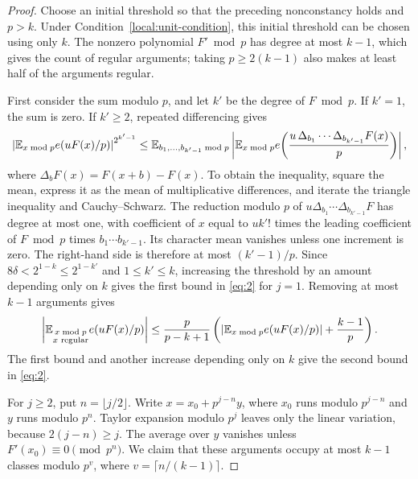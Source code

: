 \begin{proof}
Choose an initial threshold so that the preceding nonconstancy holds and
\(p>k\). Under Condition~\eqref{local:unit-condition}, this initial threshold
can be chosen using only \(k\). The nonzero polynomial \(F'\bmod p\) has
degree at most \(k-1\), which gives the count of regular arguments; taking
\(p\ge2(k-1)\) also makes at least half of the arguments regular.

First consider the sum modulo \(p\), and let \(k'\) be the degree of
\(F\bmod p\). If \(k'=1\), the sum is zero. If \(k'\ge2\), repeated
differencing gives
\[
 \left|\mathbb E_{x\bmod p}e(uF(x)/p)\right|^{2^{k'-1}}
 \le
 \mathbb E_{b_1,\ldots,b_{k'-1}\bmod p}
 \left|\mathbb E_{x\bmod p}
 e\!\left(\frac{u\,\Delta_{b_1}\cdots\Delta_{b_{k'-1}}F(x)}p\right)
 \right|,
\]
where \(\Delta_bF(x)=F(x+b)-F(x)\). To obtain the inequality, square the
mean, express it as the mean of multiplicative differences, and iterate the
triangle inequality and Cauchy--Schwarz. The reduction modulo \(p\) of
\(u\Delta_{b_1}\cdots\Delta_{b_{k'-1}}F\) has degree at most one, with
coefficient of \(x\) equal to \(u k'!\) times the leading coefficient
of \(F\bmod p\) times \(b_1\cdots b_{k'-1}\). Its character mean vanishes
unless one increment is zero. The right-hand side is therefore at most
\((k'-1)/p\). Since \(8\delta<2^{1-k}\le2^{1-k'}\) and
\(1\le k'\le k\), increasing the threshold by an amount depending only on
\(k\) gives the first bound in \eqref{eq:2} for \(j=1\). Removing at most
\(k-1\) arguments gives
\[
 \left|\mathbb E_{\substack{x\bmod p\\x\text{ regular}}}e(uF(x)/p)\right|
 \le\frac{p}{p-k+1}
       \left(\left|\mathbb E_{x\bmod p}e(uF(x)/p)\right|+\frac{k-1}{p}\right).
\]
The first bound and another increase depending only on \(k\) give the
second bound in \eqref{eq:2}.

For \(j\ge2\), put \(n=\lfloor j/2\rfloor\). Write
\(x=x_0+p^{j-n}y\), where \(x_0\) runs modulo \(p^{j-n}\) and \(y\)
runs modulo \(p^n\). Taylor expansion modulo \(p^j\) leaves only the
linear variation, because \(2(j-n)\ge j\). The average over \(y\) vanishes
unless \(F'(x_0)\equiv0\pmod{p^n}\). We claim that these arguments occupy
at most \(k-1\) classes modulo \(p^v\), where
\(v=\lceil n/(k-1)\rceil\).


\end{proof}
